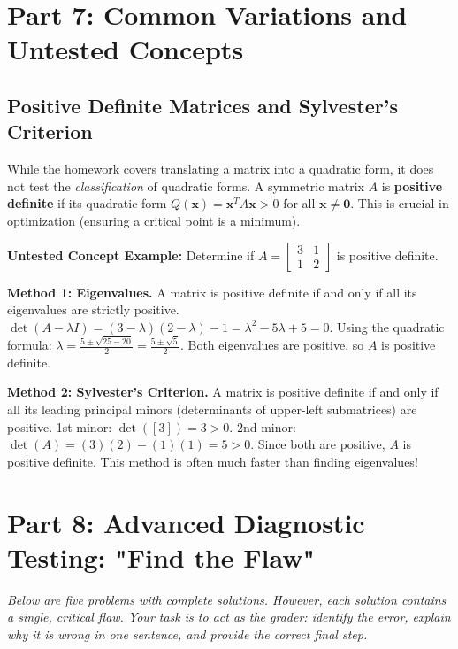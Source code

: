 \documentclass[11pt, letterpaper]{article}
\theoremstyle{definition}
\theoremstyle{remark}
\begin{document}
\newpage
\section{Part 7: Common Variations and Untested Concepts}

\subsection{Positive Definite Matrices and Sylvester's Criterion}
While the homework covers translating a matrix into a quadratic form, it does not test the \textit{classification} of quadratic forms. A symmetric matrix $A$ is \textbf{positive definite} if its quadratic form $Q(\mathbf{x}) = \mathbf{x}^T A \mathbf{x} > 0$ for all $\mathbf{x} \neq \mathbf{0}$. This is crucial in optimization (ensuring a critical point is a minimum).

\textbf{Untested Concept Example:} Determine if $A = \begin{bmatrix} 3 & 1 \\ 1 & 2 \end{bmatrix}$ is positive definite.

\textbf{Method 1: Eigenvalues.} A matrix is positive definite if and only if all its eigenvalues are strictly positive.
$\det(A - \lambda I) = (3-\lambda)(2-\lambda) - 1 = \lambda^2 - 5\lambda + 5 = 0$.
Using the quadratic formula: $\lambda = \frac{5 \pm \sqrt{25 - 20}}{2} = \frac{5 \pm \sqrt{5}}{2}$. Both eigenvalues are positive, so $A$ is positive definite.

\textbf{Method 2: Sylvester's Criterion.} A matrix is positive definite if and only if all its leading principal minors (determinants of upper-left submatrices) are positive.
1st minor: $\det([3]) = 3 > 0$.
2nd minor: $\det(A) = (3)(2) - (1)(1) = 5 > 0$.
Since both are positive, $A$ is positive definite. This method is often much faster than finding eigenvalues!

\section{Part 8: Advanced Diagnostic Testing: "Find the Flaw"}
\textit{Below are five problems with complete solutions. However, each solution contains a single, critical flaw. Your task is to act as the grader: identify the error, explain why it is wrong in one sentence, and provide the correct final step.}
\end{document}
